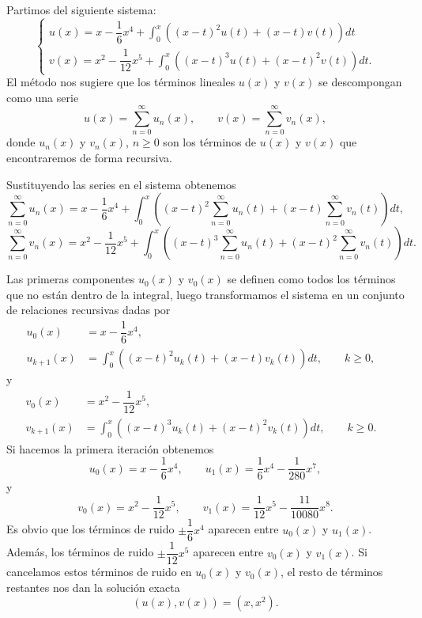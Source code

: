 \begin{ejemplo}
	Partimos del siguiente sistema:
	\begin{equation}
		\left\lbrace\begin{array}{c}u(x) = x - \dfrac{1}{6}x^4 + \displaystyle \int_{0}^{x}((x-t)^2u(t) + (x-t)v(t))dt \\ v(x) = x^2 - \dfrac{1}{12}x^5 + \displaystyle \int_{0}^{x}((x-t)^3u(t) + (x-t)^2v(t))dt. \end{array}\right.
	\end{equation}
	El método nos sugiere que los términos lineales $u(x)$ y $v(x)$ se descompongan como una serie
	\begin{equation}
		u(x) = \sum_{n=0}^{\infty}u_n(x), \qquad v(x) = \sum_{n=0}^{\infty}v_n(x),
	\end{equation}
	donde $u_n(x)$ y $v_n(x)$, $n \geqslant 0$ son los términos de $u(x)$ y $v(x)$ que encontraremos de forma recursiva.
	
	Sustituyendo las series en el sistema obtenemos
	\begin{equation}
		\sum_{n=0}^{\infty}u_n(x) = x - \dfrac{1}{6}x^4 + \int_{0}^{x}((x-t)^2\sum_{n=0}^{\infty}u_n(t) + (x-t)\sum_{n=0}^{\infty}v_n(t))dt,
	\end{equation}
	\begin{equation}
		\sum_{n=0}^{\infty}v_n(x) = x^2 - \dfrac{1}{12}x^5 + \int_{0}^{x}((x-t)^3\sum_{n=0}^{\infty}u_n(t) + (x-t)^2\sum_{n=0}^{\infty}v_n(t))dt.
	\end{equation}
	
	Las primeras componentes $u_0(x)$ y $v_0(x)$ se definen como todos los términos que no están dentro de la integral, luego transformamos el sistema en un conjunto de relaciones recursivas dadas por
	\begin{align}
		u_0(x) &= x - \dfrac{1}{6}x^4,      &   \\
		u_{k+1}(x) &= \int_{0}^{x} ((x-t)^2u_k(t) + (x-t)v_k(t))dt, \qquad k \geqslant0 ,   &
	\end{align}
	y
	\begin{align}
		v_0(x) &= x^2 - \dfrac{1}{12}x^5,      &   \\
		v_{k+1}(x) &= \int_{0}^{x} ((x-t)^3u_k(t) + (x-t)^2v_k(t))dt, \qquad k \geqslant0 .   &
	\end{align}
	Si hacemos la primera iteración obtenemos
	\begin{equation}
		u_0(x) = x - \dfrac{1}{6}x^4, \qquad u_1(x) = \dfrac{1}{6}x^4 - \dfrac{1}{280}x^7,
	\end{equation}
	y
	\begin{equation}
		v_0(x) = x^2 - \dfrac{1}{12}x^5, \qquad v_1(x) = \dfrac{1}{12}x^5 - \dfrac{11}{10080}x^8.
	\end{equation}
	Es obvio que los términos de ruido $\pm \dfrac{1}{6}x^4$ aparecen entre $u_0(x)$ y $u_1(x)$. Además, los términos de ruido $\pm \dfrac{1}{12}x^5$ aparecen entre $v_0(x)$ y $v_1(x)$. Si cancelamos estos términos de ruido en $u_0(x)$ y $v_0(x)$, el resto de términos restantes nos dan la solución exacta
	\begin{equation}
		(u(x), v(x)) = (x,x^2).
	\end{equation}
\end{ejemplo}

